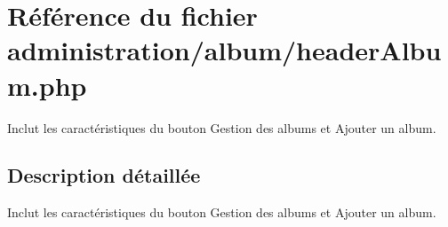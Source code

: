 \hypertarget{headerAlbum_8php}{}\section{Référence du fichier administration/album/header\+Album.php}
\label{headerAlbum_8php}


Inclut les caractéristiques du bouton Gestion des albums et Ajouter un album.  




\subsection{Description détaillée}
Inclut les caractéristiques du bouton Gestion des albums et Ajouter un album. 

